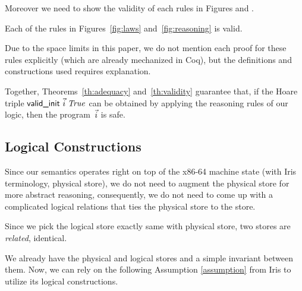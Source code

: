 Moreover we need to show the validity of each rules in Figures  and .
\begin{theorem}
\label{th:validity}
  Each of the rules in Figures~\ref{fig:laws}
  and~\ref{fig:reasoning} is valid.
\end{theorem}
Due to the space limits in this paper, we do not mention each proof for these rules explicitly (which are already mechanized in Coq),
but the definitions and constructions used requires explanation.

Together, Theorems~\ref{th:adequacy} and~\ref{th:validity} guarantee that, if
the Hoare triple $\textsf{valid\_init }\vec{i}\;\mathit{True}$ can be obtained by applying
the reasoning rules of our logic, then the program~$\vec{i}$ is safe.

\subsection{Logical Constructions}
\label{sec:invariant}

Since our semantics operates right on top of the x86-64 machine state (with Iris terminology, physical store),
we do not need to augment the physical store for more abstract reasoning, consequently, we do not need to come up
with a complicated logical relations that ties the physical store to the
\logical store. 
\begin{definition}
  \label{def:related}
  Since we pick the logical store exactly same with physical store,  
  two stores are \emph{related}, identical.
\end{definition}

We already have the physical and logical stores and a simple invariant between them. Now, we can rely on the following Assumption \ref{assumption} from Iris to utilize its logical constructions.
\newcommand{\genheapinterp}[1]{\mathit{Heap}\;#1}
\newcommand{\genmemheapinterp}[1]{\mathit{MemHeap}\;#1}
\newcommand{\pred}[1]{\ownGhost\gammaPred{\authfull{(\mapone\predstore)}}}
\newcommand{\mapone}[1]{1.#1}
\newcommand{\mapsfromexact}[3]{
  \ownGhost\gammaPred{\authfrag{\singletonMap{#1}{(#2, #3)}}}
}
\newcommand{\sh}{L'}
\newcommand{\mapsfromdef}[3]{
  \exists\sh.\;
  \mapsfromexact{#1}{#2}{\sh} \star \pure{\sh \subseteq #3}
}

